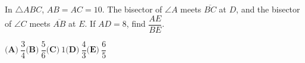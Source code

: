 In $\triangle ABC$, $AB=AC=10$. The bisector of $\angle A$ meets $\overline{BC}$ at $D$, and the bisector of $\angle C$ meets $\overline{AB}$ at $E$. If $AD=8$, find $\dfrac{AE}{BE}$.

$\textbf{(A)}\ \dfrac34$\qquad$\textbf{(B)}\ \dfrac56$\qquad$\textbf{(C)}\ 1$\qquad$\textbf{(D)}\ \dfrac43$\qquad$\textbf{(E)}\ \dfrac65$
